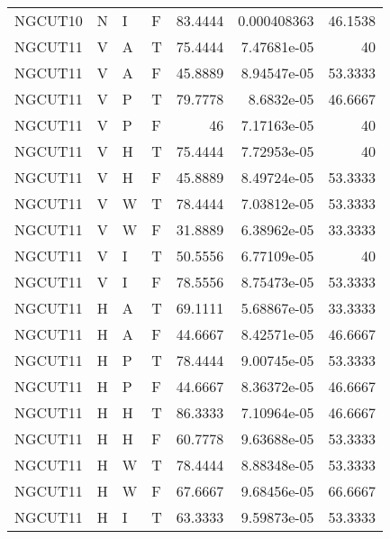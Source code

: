 \begin{longtable}{llllrrr}
    NGCUT10  & N         & I         & F          & 83.4444    & 0.000408363 & 46.1538  \\
    NGCUT11  & V         & A         & T          & 75.4444    & 7.47681e-05 & 40       \\
    NGCUT11  & V         & A         & F          & 45.8889    & 8.94547e-05 & 53.3333  \\
    NGCUT11  & V         & P         & T          & 79.7778    & 8.6832e-05  & 46.6667  \\
    NGCUT11  & V         & P         & F          & 46         & 7.17163e-05 & 40       \\
    NGCUT11  & V         & H         & T          & 75.4444    & 7.72953e-05 & 40       \\
    NGCUT11  & V         & H         & F          & 45.8889    & 8.49724e-05 & 53.3333  \\
    NGCUT11  & V         & W         & T          & 78.4444    & 7.03812e-05 & 53.3333  \\
    NGCUT11  & V         & W         & F          & 31.8889    & 6.38962e-05 & 33.3333  \\
    NGCUT11  & V         & I         & T          & 50.5556    & 6.77109e-05 & 40       \\
    NGCUT11  & V         & I         & F          & 78.5556    & 8.75473e-05 & 53.3333  \\
    NGCUT11  & H         & A         & T          & 69.1111    & 5.68867e-05 & 33.3333  \\
    NGCUT11  & H         & A         & F          & 44.6667    & 8.42571e-05 & 46.6667  \\
    NGCUT11  & H         & P         & T          & 78.4444    & 9.00745e-05 & 53.3333  \\
    NGCUT11  & H         & P         & F          & 44.6667    & 8.36372e-05 & 46.6667  \\
    NGCUT11  & H         & H         & T          & 86.3333    & 7.10964e-05 & 46.6667  \\
    NGCUT11  & H         & H         & F          & 60.7778    & 9.63688e-05 & 53.3333  \\
    NGCUT11  & H         & W         & T          & 78.4444    & 8.88348e-05 & 53.3333  \\
    NGCUT11  & H         & W         & F          & 67.6667    & 9.68456e-05 & 66.6667  \\
    NGCUT11  & H         & I         & T          & 63.3333    & 9.59873e-05 & 53.3333  \\

\end{longtable}
